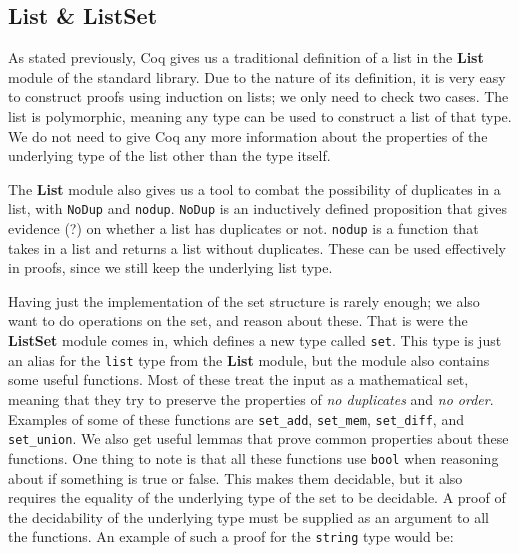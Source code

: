 
\subsection{List \& ListSet}

As stated previously, Coq gives us a traditional definition of a list in the \textbf{List} module of the standard library.
Due to the nature of its definition, it is very easy to construct proofs using induction on lists; we only need to check two cases.
The list is polymorphic, meaning any type can be used to construct a list of that type.
We do not need to give Coq any more information about the properties of the underlying type of the list other than the type itself.

The \textbf{List} module also gives us a tool to combat the possibility of duplicates in a list,
with \lstinline[language=Coq]{NoDup} and \lstinline[language=Coq]{nodup}.
\lstinline[language=Coq]{NoDup} is an inductively defined proposition that gives evidence (?)
on whether a list has duplicates or not.
\lstinline[language=Coq]{nodup} is a function that takes in a list and returns a list without duplicates.
These can be used effectively in proofs, since we still keep the underlying list type.

Having just the implementation of the set structure is rarely enough; we also want to do operations on the set, and reason about these.
That is were the \textbf{ListSet} module comes in, which defines a new type called \lstinline[language=Coq]{set}.
This type is just an alias for the \lstinline[language=Coq]{list} type from the \textbf{List} module,
but the module also contains some useful functions.
Most of these treat the input as a mathematical set,
meaning that they try to preserve the properties of \textit{no duplicates} and \textit{no order}.
Examples of some of these functions are \lstinline[language=Coq]{set_add}, \lstinline[language=Coq]{set_mem},
\lstinline[language=Coq]{set_diff}, and \lstinline[language=Coq]{set_union}.
We also get useful lemmas that prove common properties about these functions.
One thing to note is that all these functions use \lstinline[language=Coq]{bool} when reasoning about if something is true or false.
This makes them decidable, but it also requires the equality of the underlying type of the set to be decidable.
A proof of the decidability of the underlying type must be supplied as an argument to all the functions.
An example of such a proof for the \lstinline[language=Coq]{string} type would be:

